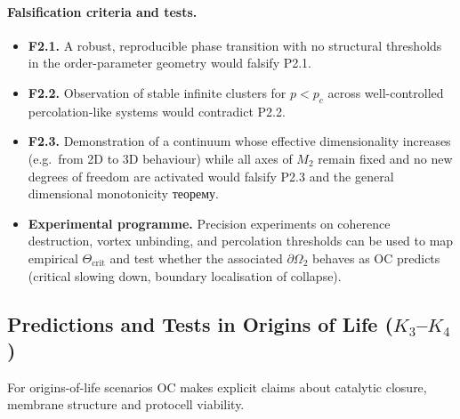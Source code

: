 \paragraph{Falsification criteria and tests.}
\begin{itemize}
  \item \textbf{F2.1.}
        A robust, reproducible phase transition with no structural
        thresholds in the order-parameter geometry would falsify P2.1.
  \item \textbf{F2.2.}
        Observation of stable infinite clusters for \(p<p_c\) across
        well-controlled percolation-like systems would contradict P2.2.
  \item \textbf{F2.3.}
        Demonstration of a continuum whose effective dimensionality increases
        (e.g.\ from 2D to 3D behaviour) while all axes of \(M_2\) remain
        fixed and no new degrees of freedom are activated would falsify
        P2.3 and the general dimensional monotonicity теорему.
  \item \textbf{Experimental programme.}
        Precision experiments on coherence destruction, vortex unbinding,
        and percolation thresholds can be used to map empirical
        \(\Theta_{\mathrm{crit}}\) and test whether the associated
        \(\partial\Omega_2\) behaves as OC predicts (critical slowing down,
        boundary localisation of collapse).
\end{itemize}

\subsection{Predictions and Tests in Origins of Life
            (\texorpdfstring{$K_3$}{K\_3}--\texorpdfstring{$K_4$}{K\_4})}

For origins-of-life scenarios OC makes explicit claims about catalytic
closure, membrane structure and protocell viability.

